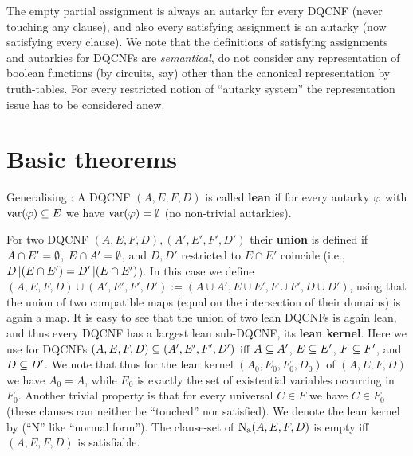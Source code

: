\documentclass[conference]{IEEEtran}
\begin{document}
The empty partial assignment is always an autarky for every DQCNF (never touching any clause), and also every satisfying assignment is an autarky (now satisfying every clause). We note that the definitions of satisfying assignments and autarkies for DQCNFs are \emph{semantical}, do not consider any representation of boolean functions (by circuits, say) other than the canonical representation by truth-tables. For every restricted notion of ``autarky system'' the representation issue has to be considered anew.



\section{Basic theorems}
\label{sec:basictheorems}

Generalising \cite[Subsection 11.8.3]{Kullmann2007HandbuchMU}: A DQCNF $(A,E,F,D)$ is called \textbf{lean} if for every autarky $\varphi$ with $\operatorname{var}(\varphi) \subseteq E$ we have $\operatorname{var}(\varphi) = \emptyset$ (no non-trivial autarkies).

For two DQCNF $(A,E,F,D), (A',E',F',D')$ their \textbf{union} is defined if $A \cap E' = \emptyset$, $E \cap A' = \emptyset$, and $D, D'$ restricted to $E \cap E'$ coincide (i.e., $D \operatorname{|} (E \cap E') = D' \operatorname{|} (E \cap E')$).
In this case we define $(A,E,F,D) \cup (A',E',F',D') := (A \cup A', E \cup E', F \cup F', D \cup D')$, using that the union of two compatible maps (equal on the intersection of their domains) is again a map.
It is easy to see that the union of two lean DQCNFs is again lean, and thus every DQCNF has a largest lean sub-DQCNF, its \textbf{lean kernel}.
Here we use for DQCNFs $(A,E,F,D) \subseteq (A',E',F',D')$ iff $A \subseteq A'$, $E \subseteq E'$, $F \subseteq F'$, and $D \subseteq D'$.
We note that thus for the lean kernel $(A_0, E_0, F_0, D_0)$ of $(A,E,F,D)$ we have $A_0 = A$, while $E_0$ is exactly the set of existential variables occurring in $F_0$.
Another trivial property is that for every universal $C \in F$ we have $C \in F_0$ (these clauses can neither be ``touched'' nor satisfied).
We denote the lean kernel by  (``N'' like ``normal form'').
The clause-set of $\operatorname{\operatorname{N}_a}(A,E,F,D)$ is empty iff $(A,E,F,D)$ is satisfiable.
\end{document}
